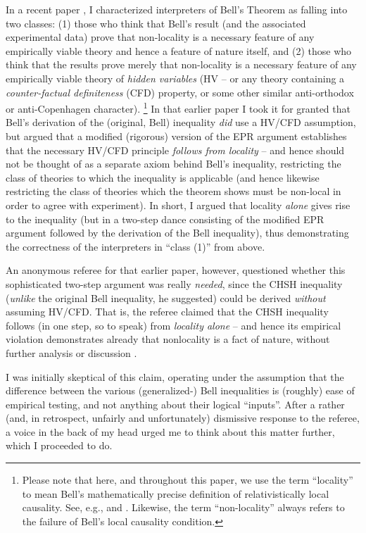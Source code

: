 \documentclass[aps,prc,onecolumn,12pt,nofootinbib]{revtex4-2}
\begin{document}
In a recent paper \cite{nonlocchar},
I characterized interpreters of Bell's Theorem
\cite{bell} as falling into two classes:  (1) those who think that
Bell's result (and the associated experimental data) prove that
non-locality is a necessary feature of any empirically viable theory
and hence a feature of nature itself, and (2) those who think that the
results prove merely that non-locality is a necessary feature of any
empirically viable theory of \emph{hidden variables} (HV -- or any theory
containing a \emph{counter-factual definiteness} (CFD) property, or some
other similar anti-orthodox or anti-Copenhagen character).%
\footnote{Please note that here, and throughout this paper, we use the
  term ``locality'' to mean Bell's
  mathematically precise definition of relativistically local
  causality.  See, e.g., \cite[pg 232-248, pg 52-62]{bell} and
  \cite{nonlocchar}.  Likewise, the term ``non-locality'' always
  refers to the failure of Bell's local causality condition.}
In that earlier paper I took it for granted that Bell's derivation of
the (original, Bell) inequality \emph{did} use a HV/CFD assumption,
but argued that a modified (rigorous) version of the EPR argument \cite{epr}
establishes that the necessary HV/CFD principle \emph{follows from
  locality} -- and hence should not be thought of as a separate axiom
behind Bell's inequality, restricting the class of theories to which
the inequality is applicable (and hence likewise restricting the class
of theories which the theorem shows must be non-local in order to agree with
experiment).  In short, I argued that locality \emph{alone} gives rise
to the inequality (but in a two-step dance consisting of the modified
EPR argument followed by the derivation of the Bell inequality), thus
demonstrating the correctness of the interpreters in ``class (1)''
from above.

An anonymous referee for that earlier paper, however, questioned
whether this sophisticated two-step argument was really \emph{needed},
since the CHSH \cite{chsh}
inequality (\emph{unlike} the original Bell inequality,
he suggested) could be derived \emph{without} assuming HV/CFD.  That
is, the referee claimed that the CHSH inequality follows (in one step,
so to speak) from \emph{locality alone} -- and hence its empirical
violation demonstrates already that nonlocality is a fact of nature,
without further analysis or discussion \cite{skyrms}.

I was initially skeptical of this claim, operating under the
assumption that the difference between the various (generalized-) Bell
inequalities is (roughly) ease of empirical testing, and not anything
about their logical ``inputs''.  After a rather (and, in retrospect,
unfairly and unfortunately) dismissive response to the referee, a
voice in the back of my head urged me to think about this matter
further, which I proceeded to do.
\end{document}

